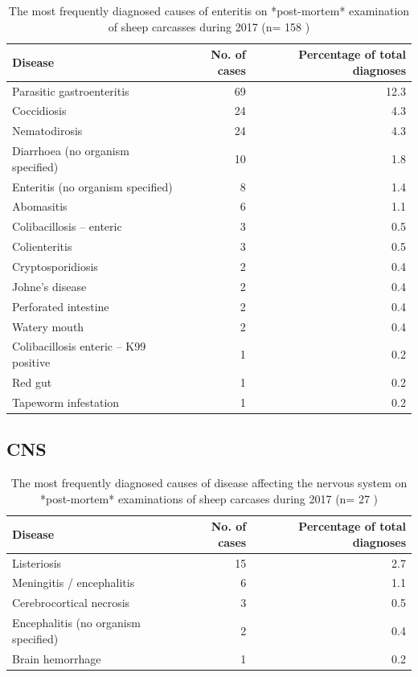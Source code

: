 \documentclass[]{book}
\begin{document}
\begin{table}

\caption{\label{tab:unnamed-chunk-99}The most frequently diagnosed causes of enteritis on *post-mortem* examination of sheep carcasses during 2017 (n= 158 )}
\centering
\begin{tabular}[t]{l|r|r}
\hline
Disease & No. of cases & Percentage of total diagnoses\\
\hline
Parasitic gastroenteritis & 69 & 12.3\\
\hline
Coccidiosis & 24 & 4.3\\
\hline
Nematodirosis & 24 & 4.3\\
\hline
Diarrhoea (no organism specified) & 10 & 1.8\\
\hline
Enteritis (no organism specified) & 8 & 1.4\\
\hline
Abomasitis & 6 & 1.1\\
\hline
Colibacillosis – enteric & 3 & 0.5\\
\hline
Colienteritis & 3 & 0.5\\
\hline
Cryptosporidiosis & 2 & 0.4\\
\hline
Johne’s disease & 2 & 0.4\\
\hline
Perforated intestine & 2 & 0.4\\
\hline
Watery mouth & 2 & 0.4\\
\hline
Colibacillosis enteric – K99 positive & 1 & 0.2\\
\hline
Red gut & 1 & 0.2\\
\hline
Tapeworm infestation & 1 & 0.2\\
\hline
\end{tabular}
\end{table}

\subsection{CNS}\label{cns}

\begin{table}

\caption{\label{tab:unnamed-chunk-102}The most frequently diagnosed causes of disease affecting the nervous system  on *post-mortem* examinations of sheep carcases during 2017 (n= 27 )}
\centering
\begin{tabular}[t]{l|r|r}
\hline
Disease & No. of cases & Percentage of total diagnoses\\
\hline
Listeriosis & 15 & 2.7\\
\hline
Meningitis / encephalitis & 6 & 1.1\\
\hline
Cerebrocortical necrosis & 3 & 0.5\\
\hline
Encephalitis (no organism specified) & 2 & 0.4\\
\hline
Brain hemorrhage & 1 & 0.2\\
\hline
\end{tabular}
\end{table}
\end{document}
